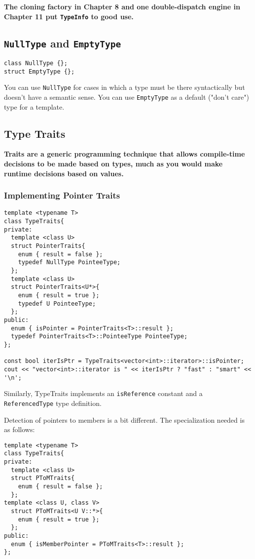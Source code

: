 \textbf{The cloning factory in Chapter 8 and one double-dispatch
  engine in Chapter 11 put \texttt{TypeInfo} to good use. }

\subsection{\texttt{NullType} and \texttt{EmptyType}}

\begin{verbatim}
class NullType {};
struct EmptyType {};
\end{verbatim}

You can use \texttt{NullType} for cases in which a type must be there
syntactically but doesn't have a semantic sense. You can use
\texttt{EmptyType} as a default ("don't care") type for a template.

\subsection{Type Traits}

\textbf{Traits are a generic programming technique that allows
  compile-time decisions to be made based on types, much as you would
  make runtime decisions based on values.}

\subsubsection{ Implementing Pointer Traits}

\begin{verbatim}
template <typename T>
class TypeTraits{
private:
  template <class U> 
  struct PointerTraits{
    enum { result = false };
    typedef NullType PointeeType;
  };
  template <class U> 
  struct PointerTraits<U*>{
    enum { result = true };
    typedef U PointeeType;
  };
public:
  enum { isPointer = PointerTraits<T>::result };
  typedef PointerTraits<T>::PointeeType PointeeType;
};

const bool iterIsPtr = TypeTraits<vector<int>::iterator>::isPointer;
cout << "vector<int>::iterator is " << iterIsPtr ? "fast" : "smart" << '\n';
\end{verbatim}

Similarly, TypeTraits implements an \texttt{isReference} constant and
a \texttt{ReferencedType} type definition.

Detection of pointers to members is a bit different. The
specialization needed is as follows:
\begin{verbatim}
template <typename T>
class TypeTraits{
private:
  template <class U> 
  struct PToMTraits{
    enum { result = false };
  };
template <class U, class V>
  struct PToMTraits<U V::*>{
    enum { result = true };
  };
public:
  enum { isMemberPointer = PToMTraits<T>::result };
};
\end{verbatim}

